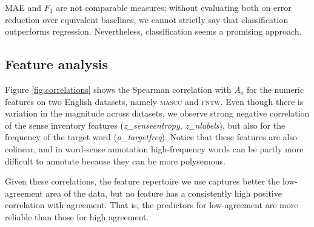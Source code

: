 \documentclass[11pt,a4paper]{article}
\begin{document}
MAE and $F_1$ are not comparable measures; without evaluating both on error reduction over equivalent baselines, we cannot strictly say that classification outperforms regression. Nevertheless, classification seems a promising approach.


%

%
%

\subsection{Feature analysis}


Figure \ref{fig:correlations} shows the Spearman correlation with $A_o$ for the numeric features on two English datasets, namely \textsc{mascc} and \textsc{fntw}. Even though there is variation in the magnitude across datasets, we observe strong negative correlation of the sense inventory features (\textit{z\_senseentropy}, \textit{z\_nlabels}), but also for the frequency of the target word (\textit{a\_targetfreq}). Notice that these features are also colinear, and in word-sense annotation high-frequency words can be partly more difficult to annotate because they can be more polysemous. 

Given these correlations, the feature repertoire we use captures better the low-agreement area of the data, but no feature has a consistently high posi\-tive correlation with agreement. That is, the predictors for low-agreement are more reliable than those for high agreement. 
\end{document}

